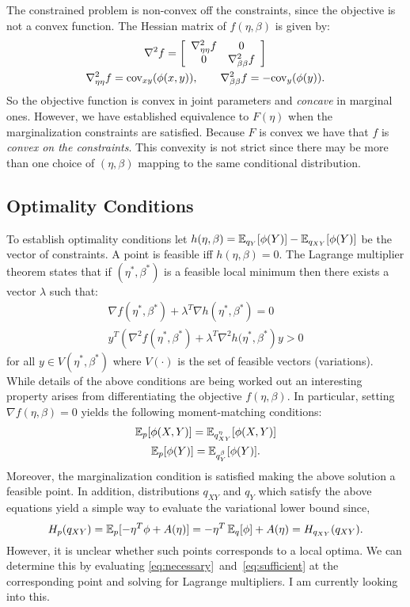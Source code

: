 \documentclass{article}
\begin{document}
The constrained problem is non-convex off the constraints, since the
objective is not a convex function.  The Hessian matrix of
$f(\eta,\beta)$ is given by:
\begin{gather}
  \nabla^2 f = \left[ \begin{array}{cccccccccccccccccccc} 
    \nabla^2_{\eta \eta} f & 0 \\
    0 & \nabla^2_{\beta \beta} f
   \end{array} \right] \\
  \nabla^2_{\eta \eta} f = \textrm{cov}_{xy}( \phi(x,y) ), \qquad
  \nabla^2_{\beta \beta} f = - \textrm{cov}_y( \phi(y) ).
\end{gather}
So the objective function is convex in joint parameters and
\emph{concave} in marginal ones.  However, we have established
equivalence to $F(\eta)$ when the marginalization constraints are
satisfied.  Because $F$ is convex we have that $f$ is 
\emph{convex on
  the constraints}. This convexity is not strict since there may be
more than one choice of $(\eta,\beta)$ mapping to the same conditional
distribution.  

\subsection{Optimality Conditions}
To establish optimality conditions let $h(\eta,\beta) = \operatorname{\mathbb{E}}_{q_Y}[
\phi(Y) ] - \operatorname{\mathbb{E}}_{q_{XY}}[ \phi(Y) ]$ be the vector of constraints.  A
point is feasible iff $h(\eta,\beta)=0$.  The Lagrange multiplier
theorem states that if $(\eta^*,\beta^*)$ is a feasible local minimum
then there exists a vector $\lambda$ such that:
\begin{gather}
  \nabla f(\eta^*,\beta^*) + \lambda^T \nabla h(\eta^*, \beta^*) = 0 \label{eq:necessary}\\
  y^T \left( \nabla^2 f(\eta^*,\beta^*) + \lambda^T \nabla^2
    h(\eta^*,\beta^* \right) y > 0 \label{eq:sufficient}
\end{gather}
for all $y \in V(\eta^*,\beta^*)$ where $V(\cdot)$ is the set of
feasible vectors (variations).  While details of the above conditions
are being worked out an interesting property arises from
differentiating the objective $f(\eta,\beta)$.  In particular, setting
$\nabla f(\eta,\beta)=0$ yields the following moment-matching
conditions:
\begin{gather}
  \operatorname{\mathbb{E}}_p[ \phi(X,Y) ] = \operatorname{\mathbb{E}}_{q^{\eta}_{XY}}[ \phi(X,Y) ] \\
  \operatorname{\mathbb{E}}_p[ \phi(Y) ] = \operatorname{\mathbb{E}}_{q^{\beta}_Y}[ \phi(Y) ].
\end{gather}
Moreover, the marginalization condition is satisfied making the above
solution a feasible point.  In addition, distributions $q_{XY}$ and
$q_Y$ which satisfy the above equations yield a simple way to evaluate
the variational lower bound since,
\[
  H_p(q_{XY}) = \operatorname{\mathbb{E}}_p[ - \eta^T \phi + A(\eta) ] = - \eta^T
  \operatorname{\mathbb{E}}_q[\phi] + A(\eta) = H_{q_{XY}}(q_{XY}).
\]
However, it is unclear whether such points corresponds to a local
optima.  We can determine this by evaluating
\EQNS\eqref{eq:necessary}~and~\eqref{eq:sufficient} at the
corresponding point and solving for Lagrange multipliers.  I am
currently looking into this.
\end{document}
